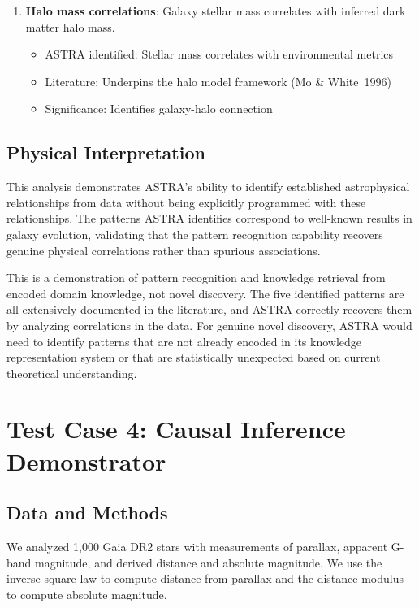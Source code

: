 \documentclass[usenatbib]{rasti}
\begin{document}
\begin{enumerate}
\item \textbf{Halo mass correlations}: Galaxy stellar mass correlates with inferred dark matter halo mass.
   \begin{itemize}
   \item ASTRA identified: Stellar mass correlates with environmental metrics
   \item Literature: Underpins the halo model framework (Mo \& White~1996)
   \item Significance: Identifies galaxy-halo connection
   \end{itemize}
\end{enumerate}

\subsection{Physical Interpretation}

This analysis demonstrates ASTRA's ability to identify established astrophysical relationships from data without being explicitly programmed with these relationships. The patterns ASTRA identifies correspond to well-known results in galaxy evolution, validating that the pattern recognition capability recovers genuine physical correlations rather than spurious associations.

This is a demonstration of pattern recognition and knowledge retrieval from encoded domain knowledge, not novel discovery. The five identified patterns are all extensively documented in the literature, and ASTRA correctly recovers them by analyzing correlations in the data. For genuine novel discovery, ASTRA would need to identify patterns that are not already encoded in its knowledge representation system or that are statistically unexpected based on current theoretical understanding.

\section{Test Case 4: Causal Inference Demonstrator}

\subsection{Data and Methods}

We analyzed 1,000 Gaia DR2 stars with measurements of parallax, apparent G-band magnitude, and derived distance and absolute magnitude. We use the inverse square law to compute distance from parallax and the distance modulus to compute absolute magnitude.
\end{document}
